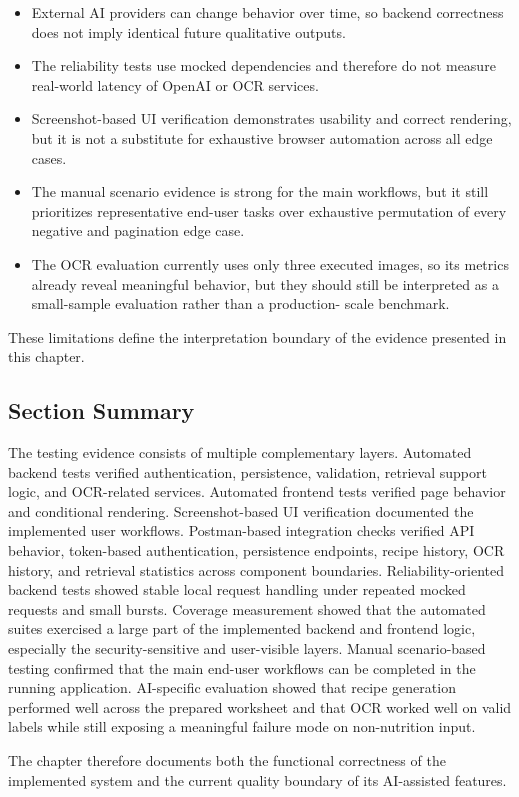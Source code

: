 \begin{itemize}
	\item External AI providers can change behavior over time, so backend
	correctness does not imply identical future qualitative outputs.
	\item The reliability tests use mocked dependencies and therefore do not
	measure real-world latency of OpenAI or OCR services.
	\item Screenshot-based UI verification demonstrates usability and
	correct rendering, but it is not a substitute for exhaustive browser
	automation across all edge cases.
	\item The manual scenario evidence is strong for the main workflows,
	but it still prioritizes representative end-user tasks over exhaustive
	permutation of every negative and pagination edge case.
	\item The OCR evaluation currently uses only three executed images, so
	its metrics already reveal meaningful behavior, but they should still
	be interpreted as a small-sample evaluation rather than a production-
	scale benchmark.
\end{itemize}

These limitations define the interpretation boundary of the evidence
presented in this chapter.

\subsection{Section Summary}

The testing evidence consists of multiple complementary layers.
Automated backend tests verified authentication, persistence,
validation, retrieval support logic, and OCR-related services.
Automated frontend tests verified page behavior and conditional
rendering. Screenshot-based UI verification documented the implemented
user workflows. Postman-based integration checks verified API behavior,
token-based authentication, persistence endpoints, recipe history, OCR
history, and retrieval statistics across component boundaries.
Reliability-oriented backend tests showed stable local request handling
under repeated mocked requests and small bursts. Coverage measurement
showed that the automated suites exercised a large part of the
implemented backend and frontend logic, especially the
security-sensitive and user-visible layers. Manual scenario-based
testing confirmed that the main end-user workflows can be completed in
the running application. AI-specific evaluation showed that recipe
generation performed well across the prepared worksheet and that OCR
worked well on valid labels while still exposing a meaningful failure
mode on non-nutrition input.

The chapter therefore documents both the functional correctness of the
implemented system and the current quality boundary of its AI-assisted
features.
